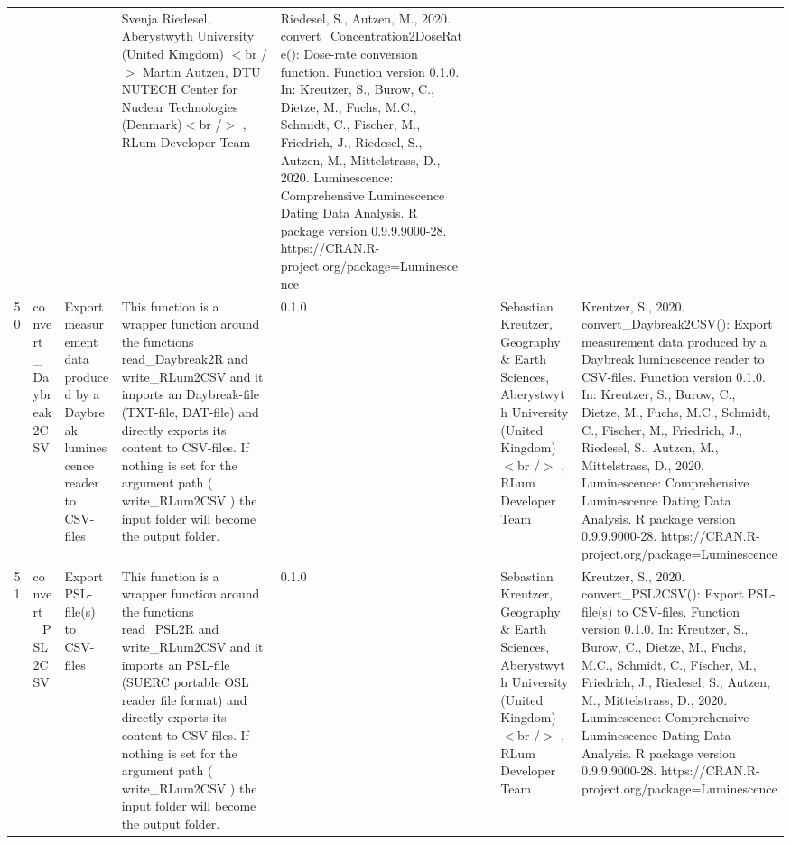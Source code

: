 \begin{table}[ht]
\begin{tabular}{rllllllll}
 &  &  & Svenja Riedesel, Aberystwyth University (United Kingdom)  $<$br /$>$ Martin Autzen, DTU NUTECH Center for Nuclear Technologies (Denmark)$<$br /$>$ , RLum Developer Team & Riedesel, S., Autzen, M., 2020. convert\_Concentration2DoseRate(): Dose-rate conversion function. Function version 0.1.0. In: Kreutzer, S., Burow, C., Dietze, M., Fuchs, M.C., Schmidt, C., Fischer, M., Friedrich, J., Riedesel, S., Autzen, M., Mittelstrass, D., 2020. Luminescence: Comprehensive Luminescence Dating Data Analysis. R package version 0.9.9.9000-28. https://CRAN.R-project.org/package=Luminescence
 \\ 
  50 & convert\_Daybreak2CSV & Export measurement data produced by a Daybreak luminescence reader to CSV-files & This function is a wrapper function around the functions  read\_Daybreak2R  and write\_RLum2CSV  and it imports an Daybreak-file (TXT-file, DAT-file) and directly exports its content to CSV-files.  If nothing is set for the argument  path  ( write\_RLum2CSV ) the input folder will become the output folder. & 0.1.0
 &  &  & Sebastian Kreutzer, Geography \& Earth Sciences, Aberystwyth University (United Kingdom)$<$br /$>$ , RLum Developer Team & Kreutzer, S., 2020. convert\_Daybreak2CSV(): Export measurement data produced by a Daybreak luminescence reader to CSV-files. Function version 0.1.0. In: Kreutzer, S., Burow, C., Dietze, M., Fuchs, M.C., Schmidt, C., Fischer, M., Friedrich, J., Riedesel, S., Autzen, M., Mittelstrass, D., 2020. Luminescence: Comprehensive Luminescence Dating Data Analysis. R package version 0.9.9.9000-28. https://CRAN.R-project.org/package=Luminescence
 \\ 
  51 & convert\_PSL2CSV & Export PSL-file(s) to CSV-files & This function is a wrapper function around the functions  read\_PSL2R  and write\_RLum2CSV  and it imports an PSL-file (SUERC portable OSL reader file format) and directly exports its content to CSV-files. If nothing is set for the argument  path  ( write\_RLum2CSV ) the input folder will become the output folder. & 0.1.0
 &  &  & Sebastian Kreutzer, Geography \& Earth Sciences, Aberystwyth University (United Kingdom)$<$br /$>$ , RLum Developer Team & Kreutzer, S., 2020. convert\_PSL2CSV(): Export PSL-file(s) to CSV-files. Function version 0.1.0. In: Kreutzer, S., Burow, C., Dietze, M., Fuchs, M.C., Schmidt, C., Fischer, M., Friedrich, J., Riedesel, S., Autzen, M., Mittelstrass, D., 2020. Luminescence: Comprehensive Luminescence Dating Data Analysis. R package version 0.9.9.9000-28. https://CRAN.R-project.org/package=Luminescence
 \\ 

\end{tabular}
\end{table}

